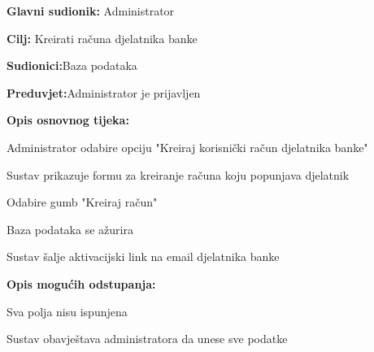 \noindent {}

\begin{packed_item}
	
	\item \textbf{Glavni sudionik: }{Administrator}
	\item  \textbf{Cilj:} {Kreirati računa djelatnika banke}
	\item  \textbf{Sudionici:}{Baza podataka}
	\item  \textbf{Preduvjet:}{Administrator je prijavljen}
	\item  \textbf{Opis osnovnog tijeka:}
	
	\item[] \begin{packed_enum}
		
		\item {Administrator odabire opciju "Kreiraj korisnički račun djelatnika banke"}
		\item {Sustav prikazuje formu za kreiranje računa koju popunjava djelatnik} 
		\item {Odabire gumb "Kreiraj račun"}
		\item {Baza podataka se ažurira}
		\item {Sustav šalje aktivacijski link na email djelatnika banke}
	\end{packed_enum}
	
	\item  \textbf{Opis mogućih odstupanja:}
	
	\item[] \begin{packed_item}
		
		\item[2.a]{Sva polja nisu ispunjena}
		\item[] \begin{packed_enum}
			
			\item Sustav obavještava administratora da unese sve podatke
			
		\end{packed_enum}
	\end{packed_item}
\end{packed_item}
\eject 

